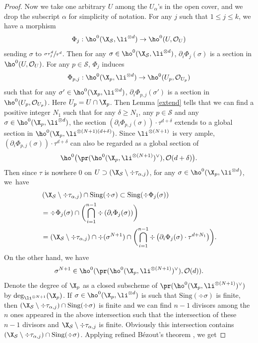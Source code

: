 \begin{proof}
Now we take one arbitrary $U$ among the $U_{\alpha}$'s in the open cover, and we drop the subscript $\alpha$ for simplicity of notation. For any $j$ such that $1\leq j\leq k$, we have a morphism
\[
\Phi_{j}: \ho^0(\X_{\mathcal{S}}, \li^{\otimes d}) \to \ho^0(U,\mathcal{O}_{U})
\]
sending $\sigma$ to $\sfrac{\sigma\tau_{j}^{d}}{\tau^{d}}$. Then for any $\sigma\in \ho^0(\X_{\mathcal{S}}, \li^{\otimes d})$, $\partial_{i}\Phi_{j}(\sigma)$ is a section in $\ho^0(U,\mathcal{O}_{U})$. For any $p\in \mathcal{S}$, $\Phi_{j}$ induces
\[
\Phi_{p,j}: \ho^0(\X_{p}, \li^{\otimes d}) \to \ho^0(U_p,\mathcal{O}_{U_p})
\] such that for any $\sigma'\in \ho^0(\X_{p}, \li^{\otimes d})$, $\partial_{i}\Phi_{p,j}(\sigma')$ is a section in $\ho^0(U_p,\mathcal{O}_{U_p})$. Here $U_p=U\cap \X_p$. Then Lemma \ref{extend} tells that we can find a positive integer $N_1$ such that for any $\delta\geq N_1$, any $p\in \mathcal{S}$ and any $\sigma\in \ho^0(\X_{p}, \li^{\otimes d})$, the section $\left(\partial_i \Phi_{p,j}(\sigma) \right)\cdot \tau^{d+\delta}$ extends to a global section in $\ho^0(\X_p, \li^{\otimes (N+1)(d+\delta)})$. Since $\li^{\otimes (N+1)}$ is very ample, $\left(\partial_i \Phi_{p,j}(\sigma) \right)\cdot \tau^{d+\delta}$ can also be regarded as a global section of
\[
\ho^0\bigl(\pr(\ho^0(\X_{p}, \li^{\otimes (N+1)})^{\vee}), \mathcal{O}(d+\delta)\bigr).
\]
Then since $\tau$ is nowhere $0$ on $U\supset \left(\X_{\mathcal{S}}\setminus \div \tau_{\alpha,j}\right)$, for any $\sigma\in \ho^0(\X_{p}, \li^{\otimes d})$, we~have
\begin{align*}
&\left(\X_{\mathcal{S}}\setminus \div \tau_{\alpha,j}\right)\cap \mathrm{Sing}(\div \sigma)\subset \mathrm{Sing}(\div \Phi_j(\sigma)) \\
&=\div \Phi_j(\sigma)\cap \biggl(\bigcap_{i=1}^{n-1}\div \left(\partial_i \Phi_j(\sigma) \right)\biggr) \\
&= \left(\X_{\mathcal{S}}\setminus \div \tau_{\alpha,j}\right)\cap \div (\sigma^{N+1})\cap \biggl(\bigcap_{i=1}^{n-1}\div \left(\partial_i \Phi_j(\sigma) \cdot \tau^{d+N_1} \right)\biggr).
\end{align*}
On the other hand, we have
\[
\sigma^{N+1}\in \ho^0(\pr(\ho^0(\X_p, \li^{\otimes (N+1)})^{\vee}), \mathcal{O}(d)).
\]
Denote the degree of $\X_p$ as a closed subscheme of $\pr(\ho^0(\X_p, \li^{\otimes (N+1)})^{\vee})$ by $\deg_{\li^{\otimes N+1}}(\X_p)$. If $\sigma\in \ho^0(\X_{p}, \li^{\otimes d})$ is such that $\mathrm{Sing}(\div \sigma)$ is finite, then $\left(\X_{\mathcal{S}}\setminus \div \tau_{\alpha,j}\right)\cap \mathrm{Sing}(\div \sigma)$ is finite and we can find $n-1$ divisors among the $n$ ones appeared in the above intersection such that the intersection of these $n-1$ divisors and $ \X_{\mathcal{S}}\setminus \div \tau_{\alpha,j}$ is finite. Obviously this intersection contains $\left(\X_{\mathcal{S}}\setminus \div \tau_{\alpha,j}\right)\cap \mathrm{Sing}(\div \sigma)$. Applying refined Bézout's theorem \cite[Th.\,12.3]{Fu84}, we get

\end{proof}
